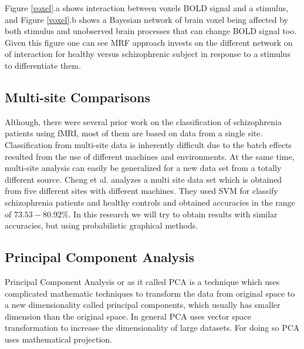 \documentclass{article} %
\begin{document}
Figure \ref{voxel}.a shows interaction between voxels BOLD signal and a 
stimulus, and Figure \ref{voxel}.b shows a Bayesian network of brain voxel 
being affected by both stimulus and unobserved brain processes that can 
change BOLD signal too. Given this figure one can see MRF approach invests 
on the different network on of interaction for healthy versus schizophrenic 
subject in response to a stimulus to differentiate them. 


\subsection{Multi-site Comparisons}
Although, there were several prior work on the classification of schizophrenia 
patients using fMRI, most of them are based on data from a single site. 
Classification from multi-site data is inherently difficult due to the batch 
effects resulted from the use of different machines and environments. At the 
same time, multi-site analysis can easily be generalized for a new data set 
from a totally different source. Cheng et al. \cite{Cheng2015} analyzes a 
multi site data set which is obtained from five different sites with different 
machines. They used SVM for classify schizophrenia patients and healthy 
controls and obtained accuracies in the range of $73.53- 80.92\%$. In this 
research we will try to obtain results with similar accuracies, but using 
probabilistic graphical methods.


\subsection{Principal Component Analysis}
Principal Component Analysis or as it called PCA is a technique which uses 
complicated mathematic techniques to transform the data from original space 
to a new dimensionality called principal components, which usually has 
smaller dimension than the original space. In general PCA uses vector 
space transformation to increase the dimensionality of large datasets. For 
doing so PCA uses mathematical projection. \cite{richardson2009principal}
\end{document}
